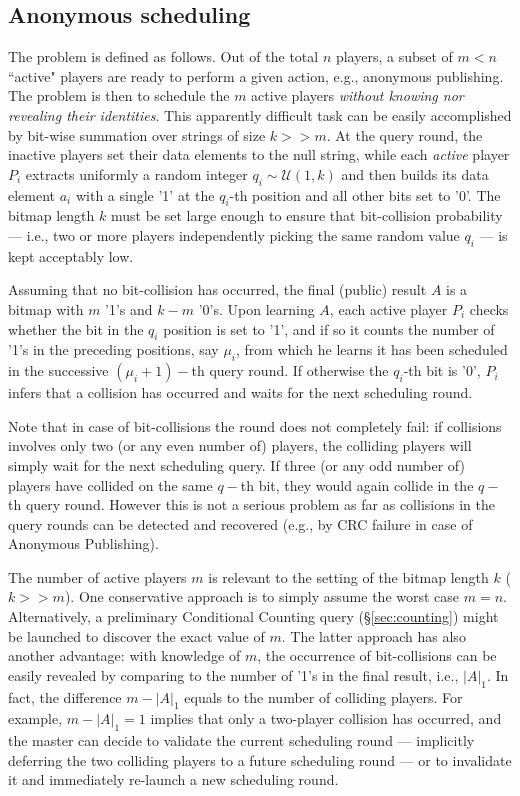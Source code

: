 \documentclass{sig-alternate}
\begin{document}
\subsection{Anonymous scheduling}\label{sec:scheduling}
The problem is defined as follows. 
Out of the total $n$ players, a subset of $m<n$ ``active" players are ready to perform a given action, e.g., anonymous publishing. 
The problem is then to schedule the $m$ active players {\em without knowing nor revealing their identities}. 
This apparently difficult task can be easily accomplished by bit-wise summation over strings of size $k>>m$. At the query round, the inactive players set their data elements to the null string, while each {\em active} player $P_i$ extracts uniformly a random integer $q_i \sim \mathcal{U}(1,k)$ 
and then builds its data element $a_i$ with a single '1' at the $q_i$-th position and all other bits set to '0'. 
The bitmap length $k$ must be set large enough to ensure that bit-collision probability --- i.e.,  two or more players independently picking the same random value $q_i$ --- is kept acceptably low. 
  
Assuming that no bit-collision has occurred, the final (public) result $A$ is a bitmap with $m$ '1's and $k-m$ '0's. 
Upon learning $A$, each active player $P_i$ checks whether the bit in the $q_i$ position is set to '1', and if so it counts the number of '1's in the preceding positions, say  $\mu_i$, from which he learns it has been scheduled  
in the successive $(\mu_i+1)-$th query round. 
If otherwise the $q_i$-th bit is  '0', $P_i$ infers that a collision has occurred and waits for the next scheduling round.

Note that in case of bit-collisions the round does not completely fail: if collisions involves only two (or any even number of) players, the colliding players will simply wait for the next scheduling query. If three (or any odd number of) players have collided on the same $q-$th bit, they would again collide in the $q-$th query round. However this is not a serious problem as far as collisions in the query rounds can be detected and recovered (e.g., by CRC failure in case of Anonymous Publishing). 

The number of active players $m$ is relevant to the setting of the bitmap length $k$ ($k>>m$). One conservative approach is to simply assume the worst case $m=n$. Alternatively, a preliminary Conditional Counting query (\S \ref{sec:counting}) might be launched to discover the exact value of $m$.  The latter approach has also another advantage: with knowledge of $m$, the occurrence of bit-collisions can be easily revealed by comparing to the number of '1's in the final result, i.e., $|A|_1$. In fact, the difference $m-|A|_1$ equals to the number of colliding players. For example, $m-|A|_1=1$ implies that only a two-player collision has occurred, 
 and the master can decide to validate the current scheduling round --- implicitly deferring the two colliding players to a future scheduling round ---  or to invalidate it and immediately re-launch a new scheduling round.
\end{document}
